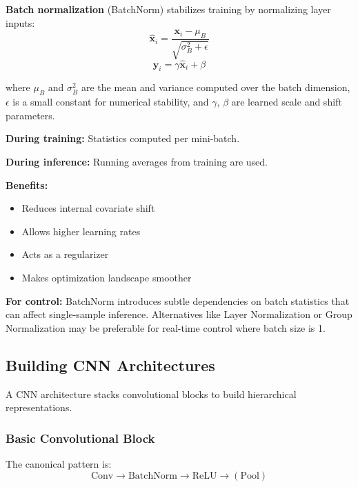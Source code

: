 \textbf{Batch normalization} (BatchNorm) stabilizes training by normalizing layer inputs:
\begin{equation}
\hat{\mathbf{x}}_i = \frac{\mathbf{x}_i - \mu_B}{\sqrt{\sigma_B^2 + \epsilon}}
\label{eq:batchnorm_normalize}
\end{equation}
\begin{equation}
\mathbf{y}_i = \gamma \hat{\mathbf{x}}_i + \beta
\label{eq:batchnorm_scale}
\end{equation}

where $\mu_B$ and $\sigma_B^2$ are the mean and variance computed over the batch dimension, $\epsilon$ is a small constant for numerical stability, and $\gamma$, $\beta$ are learned scale and shift parameters.

\textbf{During training:} Statistics computed per mini-batch.

\textbf{During inference:} Running averages from training are used.

\textbf{Benefits:}
\begin{itemize}
    \item Reduces internal covariate shift
    \item Allows higher learning rates
    \item Acts as a regularizer
    \item Makes optimization landscape smoother
\end{itemize}

\textbf{For control:} BatchNorm introduces subtle dependencies on batch statistics that can affect single-sample inference. Alternatives like Layer Normalization or Group Normalization may be preferable for real-time control where batch size is 1.

\subsection{Building CNN Architectures}

A CNN architecture stacks convolutional blocks to build hierarchical representations.

\subsubsection{Basic Convolutional Block}

The canonical pattern is:
\begin{equation}
\text{Conv} \rightarrow \text{BatchNorm} \rightarrow \text{ReLU} \rightarrow (\text{Pool})
\end{equation}

